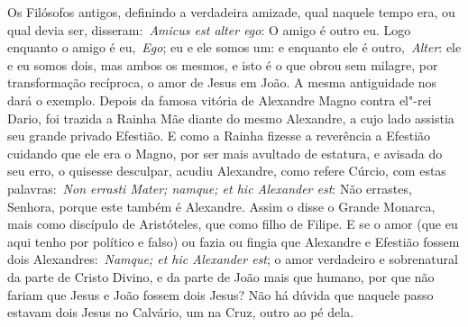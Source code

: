Os Filósofos antigos, definindo a verdadeira amizade, qual
naquele tempo era, ou qual devia ser, disseram:~\emph{Amicus est alter
ego}: O amigo é outro eu. Logo enquanto o amigo é eu,~\emph{Ego}; eu e
ele somos um: e enquanto ele é outro,~\emph{Alter}: ele e eu somos dois,
mas ambos os mesmos, e isto é o que obrou sem milagre, por transformação
recíproca, o amor de Jesus em João. A mesma antiguidade nos dará o
exemplo. Depois da famosa vitória de Alexandre Magno contra el"-rei
Dario, foi trazida a Rainha Mãe diante do mesmo Alexandre, a cujo lado
assistia seu grande privado Efestião. E como a Rainha fizesse a
reverência a Efestião cuidando que ele era o Magno, por ser mais
avultado de estatura, e avisada do seu erro, o quisesse desculpar,
acudiu Alexandre, como refere Cúrcio, com estas palavras:~\emph{Non
errasti Mater; namque; et hic Alexander est}: Não errastes, Senhora,
porque este também é Alexandre. Assim o disse o Grande Monarca, mais
como discípulo de Aristóteles, que como filho de Filipe. E se o amor
(que eu aqui tenho por político e falso) ou fazia ou fingia que
Alexandre e Efestião fossem dois Alexandres:~\emph{Namque; et hic
Alexander est}; o amor verdadeiro e sobrenatural da parte de Cristo
Divino, e da parte de João mais que humano, por que não fariam que Jesus
e João fossem dois Jesus? Não há dúvida que naquele passo estavam dois
Jesus no Calvário, um na Cruz, outro ao pé dela.

